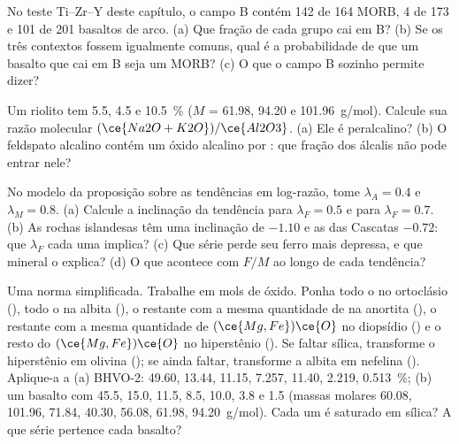 \begin{exercise}[$\star\star$]\label{exo:b2:magmatic-series:8}
No teste Ti--Zr--Y deste capítulo, o campo B contém 142 de 164 MORB, 4 de 173
 e 101 de 201 basaltos de arco. (a) Que fração de cada grupo cai
em B? (b) Se os três contextos fossem igualmente comuns, qual é a probabilidade de que um
basalto que cai em B seja um MORB? (c) O que o campo B sozinho permite dizer?
\end{exercise}

\begin{exercise}[$\star\star$]\label{exo:b2:magmatic-series:9}
Um riolito tem  5.5,  4.5 e  \qty{10.5}{\percent} ($M$ =
61.98, 94.20 e \qty{101.96}{g/mol}). Calcule sua razão molecular $(\ce{Na2O +
K2O})/\ce{Al2O3}$. (a) Ele é peralcalino? (b) O feldspato alcalino contém um
óxido alcalino por : que fração dos álcalis não pode entrar nele?
\end{exercise}

\begin{exercise}[$\star\star\star$]\label{exo:b2:magmatic-series:10}
No modelo da proposição sobre as tendências em log-razão, tome $\lambda_A = 0.4$ e $\lambda_M =
0.8$. (a) Calcule a inclinação da tendência para $\lambda_F = 0.5$ e para $\lambda_F =
0.7$. (b) As rochas islandesas têm uma inclinação de $-1.10$ e as das Cascatas
$-0.72$: que $\lambda_F$ cada uma implica? (c) Que série perde seu ferro mais depressa,
e que mineral o explica? (d) O que acontece com $F/M$ ao longo de cada tendência?
\end{exercise}

\begin{exercise}[$\star\star\star$]\label{exo:b2:magmatic-series:11}
Uma norma simplificada. Trabalhe em mols de óxido. Ponha todo o  no ortoclásio
(), todo o  na albita (), o
 restante com a mesma quantidade de  na anortita (), o
 restante com a mesma quantidade de $(\ce{Mg,Fe})\ce{O}$ no diopsídio
() e o resto do $(\ce{Mg,Fe})\ce{O}$ no hiperstênio
(). Se faltar sílica, transforme o hiperstênio em olivina
(); se ainda faltar, transforme a albita em nefelina
(). Aplique-a a (a) BHVO-2:  49.60,  13.44,
 11.15,  7.257,  11.40,  2.219, 
\qty{0.513}{\percent}; (b) um basalto com 45.5, 15.0, 11.5, 8.5, 10.0, 3.8 e 1.5 (massas
molares  60.08,  101.96,  71.84,  40.30, 
56.08,  61.98,  \qty{94.20}{g/mol}). Cada um é saturado em sílica? A
que série pertence cada basalto?
\end{exercise}

